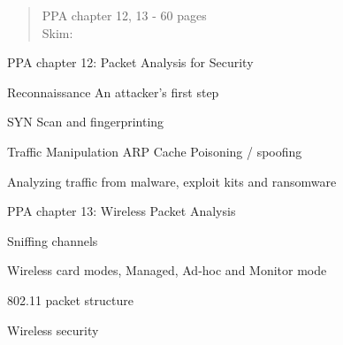 \documentclass[Screen16to9,17pt]{foils}
\begin{document}

\begin{quote}
PPA chapter 12, 13 - 60 pages\\
Skim:\\
\end{quote}



\begin{alltt}\footnotesize

\end{alltt}

\begin{list1}
\item PPA chapter 12: Packet Analysis for Security
\begin{list2}
\item Reconnaissance An attacker’s first step
\item SYN Scan and fingerprinting
\item Traffic Manipulation ARP Cache Poisoning / spoofing
\item  Analyzing traffic from malware, exploit kits and ransomware
\end{list2}
\end{list1}



\begin{alltt}\footnotesize

\end{alltt}

\begin{list1}
\item PPA chapter 13: Wireless Packet Analysis
\begin{list2}
\item Sniffing channels
\item Wireless card modes, Managed, Ad-hoc and Monitor mode
\item 802.11 packet structure
\item Wireless security
\end{list2}
\end{list1}



\end{document}
